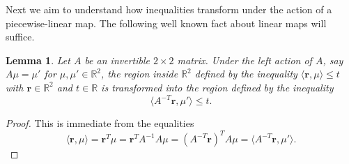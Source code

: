 \documentclass{amsart}
\newtheorem{lemma}[theorem]{Lemma}
\numberwithin{theorem}{section}
\newcommand{\bfr}{\boldsymbol{r}}
\newcommand{\RR}{\mathbb{R}}
\begin{document}
  Next we aim to understand how inequalities transform under the action of a piecewise-linear map.
  The following well known fact about linear maps will suffice.

  \begin{lemma}
    \label{le:transformed inequalities}
    Let $A$ be an invertible $2\times 2$ matrix.
    Under the left action of $A$, say $A\mu=\mu'$ for $\mu,\mu'\in\RR^2$, the region inside $\RR^2$ defined by the inequality $\langle\bfr,\mu\rangle \le t$ with $\bfr\in\RR^2$ and $t\in\RR$ is transformed into the region defined by the inequality 
    \[
      \langle A^{-T}\bfr,\mu'\rangle\le t.
    \]
  \end{lemma}
  \begin{proof}
    This is immediate from the equalities
    \[
      \langle \bfr,\mu\rangle
      =
      \bfr^T\mu
      =
      \bfr^TA^{-1}A\mu
      =
      (A^{-T}\bfr)^TA\mu
      =
      \langle A^{-T}\bfr,\mu'\rangle.
    \]
  \end{proof}
 
\end{document}
